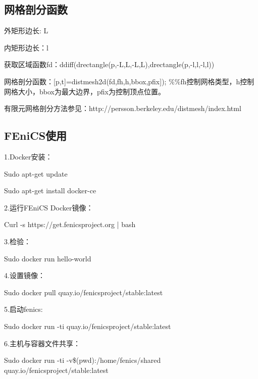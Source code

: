 \documentclass[12pt,a4paper]{article}
\begin{document}
\subsection{网格剖分函数}

外矩形边长: L

内矩形边长：l  

获取区域函数fd：ddiff(drectangle(p,-L,L,-L,L),drectangle(p,-l,l,-l,l))

网格剖分函数：[p,t]=distmesh2d(fd,fh,h,bbox,pfix]); \%\%fh控制网格类型，h控制网格大小，bbox为最大边界，pfix为控制顶点位置。

有限元网格剖分方法参见：http://persson.berkeley.edu/distmesh/index.html


\subsection{FEniCS使用}

1.Docker安装：

Sudo apt-get update

Sudo apt-get install docker-ce

2.运行FEniCS Docker镜像：

Curl  -s https://get.fenicsproject.org | bash

3.检验：

Sudo docker run hello-world

4.设置镜像：

Sudo docker pull quay.io/fenicsproject/stable:latest

5.启动fenics:

Sudo docker run -ti quay.io/fenicsproject/stable:latest

6.主机与容器文件共享：

Sudo docker run -ti -v\$(pwd):/home/fenics/shared quay.io/fenicsproject/stable:latest
\end{document}
